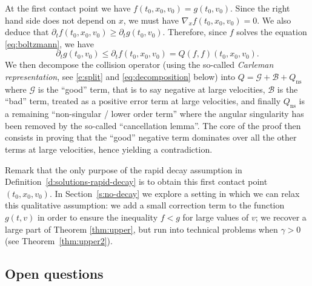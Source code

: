 \documentclass[11pt]{article}
\newcommand{\ns}{\mathrm{ns}}
\theoremstyle{plain}
\theoremstyle{definition}
\numberwithin{equation}{section}
\begin{document}
At the first contact point we have $f(t_0,x_0,v_0)= g(t_0,v_0)$.
Since the right hand side does not depend on $x$, we must have
$\nabla_x f(t_0,x_0,v_0)=0$. We also deduce that
$\partial_t f(t_0,x_0,v_0) \geq \partial_t g(t_0,v_0)$. Therefore,
since $f$ solves the equation \eqref{eq:boltzmann}, we have
\begin{equation} \label{e:to-contradict} \partial_t g(t_0,v_0) \leq
\partial_t f (t_0,x_0,v_0)= Q(f,f) (t_0,x_0,v_0).
\end{equation}
We then decompose the collision operator (using the
so-called \emph{Carleman representation}, see \eqref{e:split} and
\eqref{eq:decomposition} below) into
$Q=\mathcal G + \mathcal B + Q_{\ns}$ where $\mathcal G$ is the
``good'' term, that is to say negative at large velocities,
$\mathcal B$ is the ``bad'' term, treated as a positive error term at
large velocities, and finally $Q_{\ns}$ is a remaining ``non-singular / lower order
term'' where the angular singularity has been
removed by the so-called ``cancellation lemma''. The core of the
proof then consists in proving that the ``good'' negative term
dominates over all the other terms at large velocities, hence yielding
a contradiction.

Remark that the only purpose of the rapid decay assumption in
Definition~\ref{d:solutions-rapid-decay} is to obtain this first
contact point $(t_0,x_0,v_0)$. In Section~\ref{s:no-decay} we explore
a setting in which we can relax this qualitative assumption: we add a
small correction term to the function $g(t,v)$ in order to ensure the
inequality $f < g$ for large values of $v$; we recover a large part of
Theorem \ref{thm:upper}, but run into technical problems when
$\gamma > 0$ (see Theorem~\ref{thm:upper2}).

\subsection{Open questions}
\end{document}
